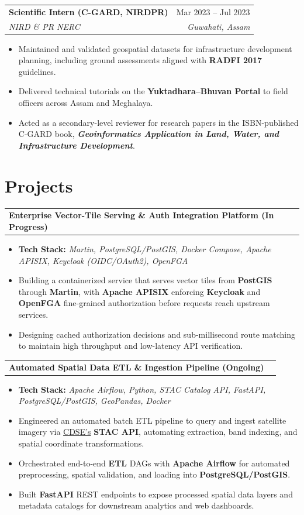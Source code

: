 \documentclass[letterpaper,11pt]{article}
\makeatletter
\newcommand{\resumeItem}[1]{
  \item\small{
    {#1 \vspace{-2pt}}
  }
}
\newcommand{\resumeSubheading}[4]{
  \vspace{-2pt}\item
    \begin{tabular*}{0.97\textwidth}[t]{l@{\extracolsep{\fill}}r}
      \textbf{#1} & #2 \\
      \textit{\small#3} & \textit{\small #4} \\
    \end{tabular*}\vspace{-7pt}
}
\newcommand{\resumeProjectHeading}[2]{
    \item
    \begin{tabular*}{0.97\textwidth}{l@{\extracolsep{\fill}}r}
      \small#1 & #2 \\
    \end{tabular*}\vspace{-7pt}
}
\newcommand{\resumeItemListStart}{\begin{itemize}}
\newcommand{\resumeItemListEnd}{\end{itemize}\vspace{-5pt}}
\makeatother
\begin{document}
      \resumeSubheading
  {Scientific Intern (C-GARD, NIRDPR)}{Mar 2023 -- Jul 2023}
  {NIRD \& PR NERC}{Guwahati, Assam}
\resumeItemListStart
\resumeItem{Maintained and validated geospatial datasets for infrastructure development planning, including ground assessments aligned with \textbf{RADFI 2017} guidelines.}
\resumeItem{Delivered technical tutorials on the \textbf{Yuktadhara--Bhuvan Portal} to field officers across Assam and Meghalaya.}
\resumeItem{Acted as a secondary-level reviewer for research papers in the ISBN-published C-GARD book, \textit{\textbf{Geoinformatics Application in Land, Water, and Infrastructure Development}}.}
\resumeItemListEnd

\vspace{-10pt}
\section{Projects} 
\vspace{-10pt}
\resumeProjectHeading
{\textbf{Enterprise Vector-Tile Serving \& Auth Integration Platform (In Progress)}}{}
\resumeItemListStart
\resumeItem{\textbf{Tech Stack:}\textit{ Martin, PostgreSQL/PostGIS, Docker Compose, Apache APISIX, Keycloak (OIDC/OAuth2), OpenFGA}}
\resumeItem{Building a containerized service that serves vector tiles from \textbf{PostGIS} through \textbf{Martin}, with \textbf{Apache APISIX} enforcing \textbf{Keycloak} and \textbf{OpenFGA} fine-grained authorization before requests reach upstream services.}
\resumeItem{Designing cached authorization decisions and sub-millisecond route matching to maintain high throughput and low-latency API verification.}
\resumeItemListEnd

\resumeProjectHeading 
{\textbf{Automated Spatial Data ETL \& Ingestion Pipeline (Ongoing)}}{} 
\resumeItemListStart 
\resumeItem{\textbf{Tech Stack:}\textit{ Apache Airflow, Python, STAC Catalog API, FastAPI, PostgreSQL/PostGIS, GeoPandas, Docker}} 
\resumeItem{Engineered an automated batch ETL pipeline to query and ingest satellite imagery via \href{https://dataspace.copernicus.eu/}{CDSE's} \textbf{STAC API}, automating extraction, band indexing, and spatial coordinate transformations.} 
\resumeItem{Orchestrated end-to-end \textbf{ETL} DAGs with \textbf{Apache Airflow} for automated preprocessing, spatial validation, and loading into \textbf{PostgreSQL/PostGIS}.} 
\resumeItem{Built \textbf{FastAPI} REST endpoints to expose processed spatial data layers and metadata catalogs for downstream analytics and web dashboards.} 
\resumeItemListEnd 
\end{document}
